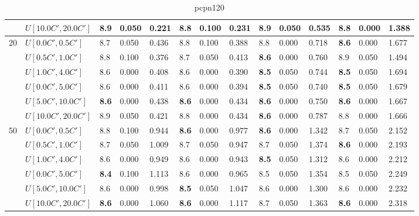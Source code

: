 \begin{table}[h]
{\begin{tabular}{|l|l||l|l|l||l|l|l||l|l|l||l|l|l|}
       & $U[10.0C',20.0C']$ & 8.9 & 0.050 & 0.221 & \textbf{8.8} & 0.100 & 0.231 & 8.9 & 0.050 & 0.535 & \textbf{8.8} & 0.000 & 1.388 \\
      \hline\hline
      \multirow{6}{*}{20} & $U[0.0C',0.5C']$ & 8.7 & 0.050 & 0.436 & 8.8 & 0.100 & 0.388 & 8.8 & 0.000 & 0.718 & \textbf{8.6} & 0.000 & 1.677 \\
       & $U[0.5C',1.0C']$ & 8.8 & 0.100 & 0.376 & 8.7 & 0.050 & 0.413 & \textbf{8.6} & 0.000 & 0.760 & 8.9 & 0.050 & 1.494 \\
       & $U[1.0C',4.0C']$ & 8.6 & 0.000 & 0.408 & 8.6 & 0.000 & 0.390 & \textbf{8.5} & 0.050 & 0.744 & \textbf{8.5} & 0.050 & 1.694 \\
       & $U[0.0C',5.0C']$ & 8.6 & 0.000 & 0.411 & 8.6 & 0.000 & 0.394 & \textbf{8.5} & 0.050 & 0.740 & \textbf{8.5} & 0.050 & 1.679 \\
       & $U[5.0C',10.0C']$ & \textbf{8.6} & 0.000 & 0.438 & \textbf{8.6} & 0.000 & 0.434 & \textbf{8.6} & 0.000 & 0.750 & \textbf{8.6} & 0.000 & 1.667 \\
       & $U[10.0C',20.0C']$ & 8.9 & 0.050 & 0.421 & 8.8 & 0.000 & 0.434 & \textbf{8.6} & 0.000 & 0.787 & 8.8 & 0.000 & 1.666 \\
      \hline\hline
      \multirow{6}{*}{50} & $U[0.0C',0.5C']$ & 8.8 & 0.100 & 0.944 & \textbf{8.6} & 0.000 & 0.977 & \textbf{8.6} & 0.000 & 1.342 & 8.7 & 0.050 & 2.152 \\
       & $U[0.5C',1.0C']$ & 8.7 & 0.050 & 1.009 & 8.7 & 0.050 & 0.947 & 8.7 & 0.050 & 1.374 & \textbf{8.6} & 0.000 & 2.193 \\
       & $U[1.0C',4.0C']$ & 8.6 & 0.000 & 0.949 & 8.6 & 0.000 & 0.943 & \textbf{8.5} & 0.050 & 1.312 & 8.6 & 0.000 & 2.212 \\
       & $U[0.0C',5.0C']$ & \textbf{8.4} & 0.100 & 1.113 & 8.6 & 0.000 & 0.965 & 8.5 & 0.050 & 1.354 & 8.5 & 0.050 & 2.249 \\
       & $U[5.0C',10.0C']$ & 8.6 & 0.000 & 0.998 & \textbf{8.5} & 0.050 & 1.047 & 8.6 & 0.000 & 1.300 & 8.6 & 0.000 & 2.232 \\
       & $U[10.0C',20.0C']$ & \textbf{8.6} & 0.000 & 1.060 & \textbf{8.6} & 0.000 & 1.117 & 8.7 & 0.050 & 1.363 & \textbf{8.6} & 0.000 & 2.318 \\
      \hline
      \end{tabular}
      }
      \caption{pcpn120}
      \label{tab:pcpn120}\end{table}
	
\clearpage	
	
